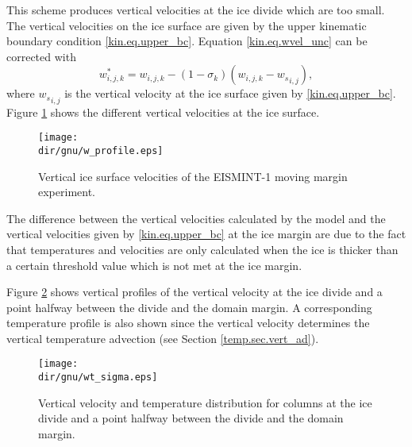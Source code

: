 This scheme produces vertical velocities at the ice divide which are too small. The vertical velocities on the ice surface are given by the upper kinematic boundary condition \eqref{kin.eq.upper_bc}. Equation \eqref{kin.eq.wvel_unc} can be corrected with
\begin{equation}
  \label{kin.eq.wvel_cor}
   w^\ast_{i,j,k}=w_{i,j,k}-(1-\sigma_k)(w_{i,j,k}-{w_s}_{i,j}),
\end{equation}
where ${w_s}_{i,j}$ is the vertical velocity at the ice surface given by \eqref{kin.eq.upper_bc}. Figure \ref{kin.fig.w_profile} shows the different vertical velocities at the ice surface.
\begin{figure}[htbp]
  \centering
  \texttt{[image: \\dir/gnu/w\_profile.eps]}
  \caption{Vertical ice surface velocities of the EISMINT-1 moving margin experiment.}
  \label{kin.fig.w_profile}
\end{figure}
The difference between the vertical velocities calculated by the model and the vertical velocities given by \eqref{kin.eq.upper_bc} at the ice margin are due to the fact that temperatures and velocities are only calculated when the ice is thicker than a certain threshold value which is not met at the ice margin.

Figure \ref{kin.fig.wt_sigma} shows vertical profiles of the vertical velocity at the ice divide and a point halfway between the divide and the domain margin. A corresponding temperature profile is also shown since the vertical velocity determines the vertical temperature advection (see Section \ref{temp.sec.vert_ad}).
\begin{figure}[htbp]
  \centering
  \texttt{[image: \\dir/gnu/wt\_sigma.eps]}
  \caption{Vertical velocity and temperature distribution for columns at the ice divide and a point halfway between the divide and the domain margin.}
  \label{kin.fig.wt_sigma}
\end{figure}
